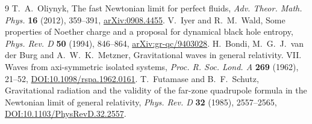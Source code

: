 \begin{thebibliography}{9}
T.~A.~Oliynyk,
The fast Newtonian limit for perfect fluids,
\emph{Adv. Theor. Math. Phys.} \textbf{16} (2012), 359--391,
\href{https://arxiv.org/abs/0908.4455}{arXiv:0908.4455}.
V.~Iyer and R.~M.~Wald,
Some properties of Noether charge and a proposal for dynamical black hole entropy,
\emph{Phys. Rev. D} \textbf{50} (1994), 846--864,
\href{https://arxiv.org/abs/gr-qc/9403028}{arXiv:gr-qc/9403028}.
H.~Bondi, M.~G.~J.~van der Burg and A.~W.~K.~Metzner,
Gravitational waves in general relativity. VII. Waves from axi-symmetric isolated systems,
\emph{Proc. R. Soc. Lond. A} \textbf{269} (1962), 21--52,
\href{https://doi.org/10.1098/rspa.1962.0161}{DOI:10.1098/rspa.1962.0161}.
T.~Futamase and B.~F.~Schutz,
Gravitational radiation and the validity of the far-zone quadrupole formula in the Newtonian limit of general relativity,
\emph{Phys. Rev. D} \textbf{32} (1985), 2557--2565,
\href{https://journals.aps.org/prd/abstract/10.1103/PhysRevD.32.2557}{DOI:10.1103/PhysRevD.32.2557}.
\end{thebibliography}


